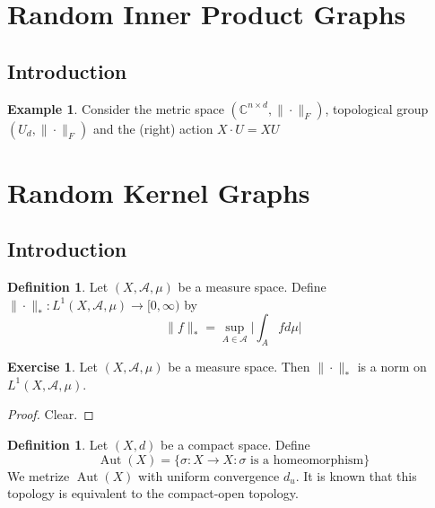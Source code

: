\documentclass[12pt]{amsart}
\theoremstyle{definition}
\newtheorem{defn}[definition]{Definition}
\newtheorem{ex}[definition]{Exercise}
\newtheorem{exm}[definition]{Example}
\newcommand{\sig}{\sigma}
\newcommand{\C}{\mathbb{C}}
\newcommand{\MA}{\mathcal{A}}
\newcommand{\Rg}{[0,\infty)}
\DeclareMathOperator{\Aut}{Aut}
\begin{document}
	
	
	
	
	
	
	
	
	
	
	
	
	\newpage
	\section{Random Inner Product Graphs}
	\subsection{Introduction}
	
	\begin{exm}
	Consider the metric space $(\C^{n \times d}, \|\cdot\|_F)$, topological group $(U_d, \|\cdot\|_F)$ and  the (right) action $X \cdot U = XU$
	\end{exm}
	
	
	
	
	
	
	
	
	
	
	
	
	\newpage
	\section{Random Kernel Graphs}	
	\subsection{Introduction}
	\begin{defn}
	Let $(X, \MA, \mu)$ be a measure space. Define $\| \cdot \|_*: L^1(X, \MA, \mu) \rightarrow \Rg$ by  
	 $$\| f \|_* = \sup_{A \in \MA} \bigg | \int_A f d\mu \bigg |$$ 
	\end{defn}
	
	\begin{ex}
	Let $(X, \MA, \mu)$ be a measure space. Then $\| \cdot \|_*$ is a norm on $L^1(X, \MA, \mu)$.
	\end{ex}
	
	\begin{proof}
	Clear.
	\end{proof}
	
	\begin{defn}
	Let $(X, d)$ be a compact space. Define $$\Aut(X) = \{\sig:X\rightarrow X: \sig \text{ is a homeomorphism} \}$$ We metrize $\Aut(X)$ with uniform convergence $d_u$. It is known that this topology is equivalent to the compact-open topology.
	\end{defn}
	
\end{document}
